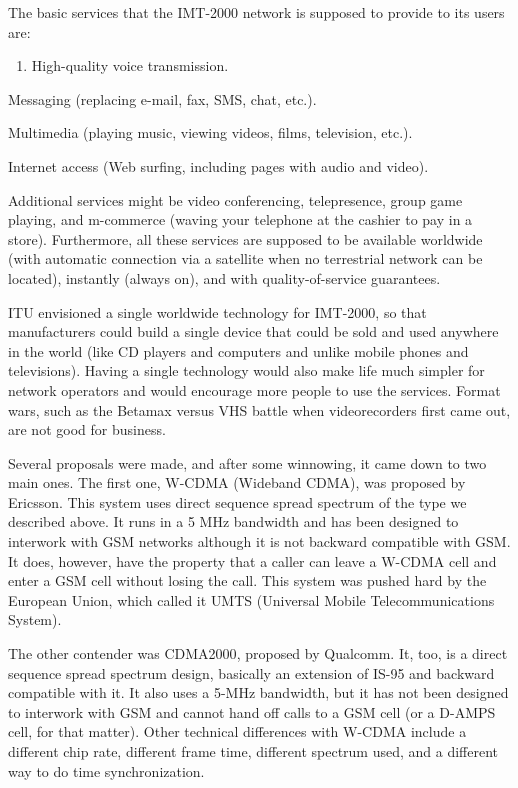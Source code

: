 The basic services that the IMT-2000 network is supposed to provide to
its users are:

\begin{enumerate}
\def\labelenumi{\arabic{enumi}.}
\item
  {}

  High-quality voice transmission.
\end{enumerate}

Messaging (replacing e-mail, fax, SMS, chat, etc.).

Multimedia (playing music, viewing videos, films, television, etc.).

Internet access (Web surfing, including pages with audio and video).

Additional services might be video conferencing, telepresence, group
game playing, and m-commerce (waving your telephone at the cashier to
pay in a store). Furthermore, all these services are supposed to be
available worldwide (with automatic connection via a satellite when no
terrestrial network can be located), instantly (always on), and with
quality-of-service guarantees.

ITU envisioned a single worldwide technology for IMT-2000, so that
manufacturers could build a single device that could be sold and used
anywhere in the world (like CD players and computers and unlike mobile
phones and televisions). Having a single technology would also make life
much simpler for network operators and would encourage more people to
use the services. Format wars, such as the Betamax versus VHS battle
when videorecorders first came out, are not good for business.

Several proposals were made, and after some winnowing, it came down to
two main ones. The first one, {W-CDMA} ({Wideband CDMA}), was proposed
by Ericsson. This system uses direct sequence spread spectrum of the
type we described above. It runs in a 5 MHz bandwidth and has been
designed to interwork with GSM networks although it is not backward
compatible with GSM. It does, however, have the property that a caller
can leave a W-CDMA cell and enter a GSM cell without losing the call.
This system was pushed hard by the European Union, which called it
{UMTS} ({Universal Mobile Telecommunications System}).

The other contender was {CDMA2000}, proposed by Qualcomm. It, too, is a
direct sequence spread spectrum design, basically an extension of IS-95
and backward compatible with it. It also uses a 5-MHz bandwidth, but it
has not been designed to interwork with GSM and cannot hand off calls to
a GSM cell (or a D-AMPS cell, for that matter). Other technical
differences with W-CDMA include a different chip rate, different frame
time, different spectrum used, and a different way to do time
synchronization.

